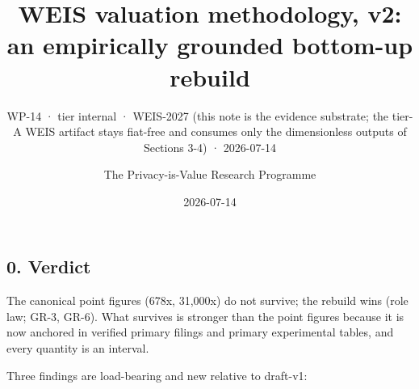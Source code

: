 \documentclass[
  11pt,
]{article}
\title{WEIS valuation methodology, v2: an empirically grounded bottom-up
rebuild}
\subtitle{WP-14 · tier internal · WEIS-2027 (this note is the evidence
substrate; the tier-A WEIS artifact stays fiat-free and consumes only
the dimensionless outputs of Sections 3-4) · 2026-07-14}
\author{The Privacy-is-Value Research Programme}
\date{2026-07-14}
\begin{document}
\maketitle

\subsection{0. Verdict}\label{verdict}

The canonical point figures (678x, 31,000x) do not survive; the rebuild
wins (role law; GR-3, GR-6). What survives is stronger than the point
figures because it is now anchored in verified primary filings and
primary experimental tables, and every quantity is an interval.

Three findings are load-bearing and new relative to draft-v1:
\end{document}
